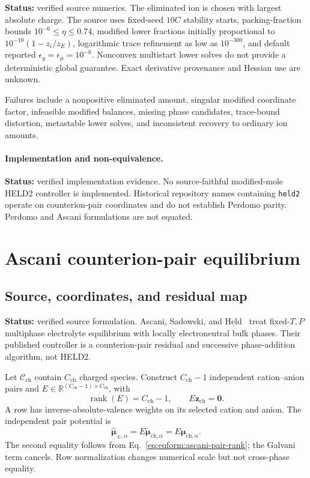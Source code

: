 \documentclass[11pt]{article}
\newcommand{\R}{\mathbb{R}}
\newcommand{\Evidence}[1]{\textsf{#1}}
\newcommand{\Status}[1]{\textbf{Status:} \Evidence{#1}.}
\newcommand{\rank}{\operatorname{rank}}
\begin{document}
\Status{verified source numerics}
The eliminated ion is chosen with largest absolute charge. The source uses
fixed-seed \(10C\) stability starts, packing-fraction bounds
\(10^{-6}\leq\eta\leq0.74\), modified lower fractions initially proportional
to \(10^{-10}(1-z_i/z_E)\), logarithmic trace refinement as low as
\(10^{-300}\), and default reported
\(\epsilon_g=\epsilon_\mu=10^{-6}\). Nonconvex multistart lower solves do not
provide a deterministic global guarantee. Exact derivative provenance and
Hessian use are \Evidence{unknown}.

Failures include a nonpositive eliminated amount, singular modified coordinate
factor, infeasible modified balances, missing phase candidates, trace-bound
distortion, metastable lower solves, and inconsistent recovery to ordinary ion
amounts.

\paragraph{Implementation and non-equivalence.}
\Status{verified implementation evidence}
No source-faithful modified-mole HELD2 controller is implemented. Historical
repository names containing \texttt{held2} operate on counterion-pair
coordinates and do not establish Perdomo parity. Perdomo and Ascani
formulations are not equated.

\section{Ascani counterion-pair equilibrium}
\label{sec:eqform:ascani-pairs}

\subsection{Source, coordinates, and residual map}

\Status{verified source formulation}
Ascani, Sadowski, and Held~\cite{Ascani2022} treat fixed-\(T,P\)
multiphase electrolyte equilibrium with locally electroneutral bulk phases.
Their published controller is a counterion-pair residual and successive
phase-addition algorithm, not HELD2.

Let \(\mathcal C_{\mathrm{ch}}\) contain \(C_{\mathrm{ch}}\) charged species.
Construct \(C_{\mathrm{ch}}-1\) independent cation--anion pairs and
\(E\in\R^{(C_{\mathrm{ch}}-1)\times C_{\mathrm{ch}}}\), with
\begin{equation}
 \rank(E)=C_{\mathrm{ch}}-1,\qquad
 E\boldsymbol z_{\mathrm{ch}}=\boldsymbol0.
\label{eq:eqform:ascani-pair-rank}
\end{equation}
A row has inverse-absolute-valence weights on its selected cation and anion.
The independent pair potential is
\begin{equation}
 \widehat{\boldsymbol\mu}_{\pm,\alpha}
 =E\widetilde{\boldsymbol\mu}_{\mathrm{ch},\alpha}
 =E\boldsymbol\mu_{\mathrm{ch},\alpha}.
\label{eq:eqform:ascani-pair-potential}
\end{equation}
The second equality follows from Eq.~\eqref{eq:eqform:ascani-pair-rank}; the
Galvani term cancels. Row normalization changes numerical scale but not
cross-phase equality.
\end{document}
